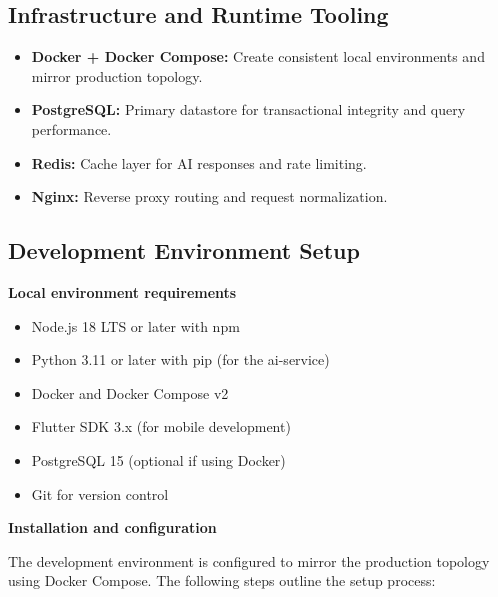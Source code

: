 \subsection{Infrastructure and Runtime Tooling}

\begin{itemize}
    \item \textbf{Docker + Docker Compose:} Create consistent local environments and mirror production topology.
    \item \textbf{PostgreSQL:} Primary datastore for transactional integrity and query performance.
    \item \textbf{Redis:} Cache layer for AI responses and rate limiting.
    \item \textbf{Nginx:} Reverse proxy routing and request normalization.
\end{itemize}

\subsection{Development Environment Setup}

\textbf{Local environment requirements}

\begin{itemize}
    \item Node.js 18 LTS or later with npm
    \item Python 3.11 or later with pip (for the ai-service)
    \item Docker and Docker Compose v2
    \item Flutter SDK 3.x (for mobile development)
    \item PostgreSQL 15 (optional if using Docker)
    \item Git for version control
\end{itemize}

\textbf{Installation and configuration}

The development environment is configured to mirror the production topology using Docker Compose. The following steps outline the setup process:

